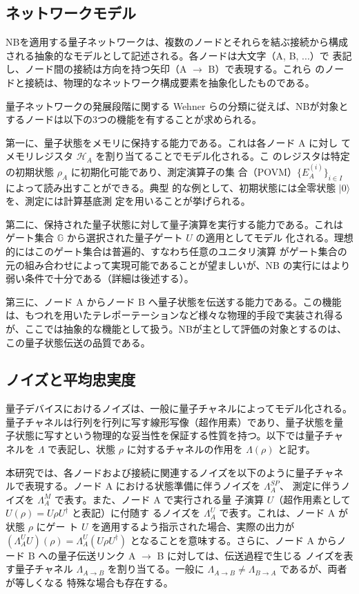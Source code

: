 \documentclass[12pt,a4paper,titlepage,dvipdfmx]{article}
\begin{document}
\subsection{ネットワークモデル}
\label{sec:ネットワークモデル}

NBを適用する量子ネットワークは、複数のノードとそれらを結ぶ接続から構成
される抽象的なモデルとして記述される。各ノードは大文字（A, B, ...）で
表記し、ノード間の接続は方向を持つ矢印（A $\to$ B）で表現する。これら
のノードと接続は、物理的なネットワーク構成要素を抽象化したものである。

量子ネットワークの発展段階に関する Wehner らの分類に従えば、NBが対象と
するノードは以下の3つの機能を有することが求められる。

第一に、量子状態をメモリに保持する能力である。これは各ノード A に対し
てメモリレジスタ $\mathcal{H}_A$ を割り当てることでモデル化される。こ
のレジスタは特定の初期状態 $\rho_A$ に初期化可能であり、測定演算子の集
合（POVM）$\{E_A^{(i)}\}_{i \in I}$ によって読み出すことができる。典型
的な例として、初期状態には全零状態 $|0\rangle$ を、測定には計算基底測
定を用いることが挙げられる。

第二に、保持された量子状態に対して量子演算を実行する能力である。これは
ゲート集合 $\mathbb{G}$ から選択された量子ゲート $U$ の適用としてモデル
化される。理想的にはこのゲート集合は普遍的、すなわち任意のユニタリ演算
がゲート集合の元の組み合わせによって実現可能であることが望ましいが、NB
の実行にはより弱い条件で十分である（詳細は後述する）。

第三に、ノード A からノード B へ量子状態を伝送する能力である。この機能
は、もつれを用いたテレポーテーションなど様々な物理的手段で実装され得る
が、ここでは抽象的な機能として扱う。NBが主として評価の対象とするのは、
この量子状態伝送の品質である。


\subsection{ノイズと平均忠実度}
\label{sec:ノイズと平均忠実度}
量子デバイスにおけるノイズは、一般に量子チャネルによってモデル化される。
量子チャネルは行列を行列に写す線形写像（超作用素）であり、量子状態を量
子状態に写すという物理的な妥当性を保証する性質を持つ。以下では量子チャ
ネルを $\Lambda$ で表記し、状態 $\rho$ に対するチャネルの作用を
$\Lambda(\rho)$ と記す。

本研究では、各ノードおよび接続に関連するノイズを以下のように量子チャネ
ルで表現する。ノード A における状態準備に伴うノイズを $\Lambda_A^{SP}$、
測定に伴うノイズを $\Lambda_A^M$ で表す。また、ノード A で実行される量
子演算 $U$（超作用素として $U(\rho) = U\rho U^\dagger$ と表記）に付随す
るノイズを $\Lambda_A^U$ で表す。これは、ノード A が状態 $\rho$ にゲー
ト $U$ を適用するよう指示された場合、実際の出力が $(\Lambda_A^U U)(\rho)
= \Lambda_A^U(U\rho U^\dagger)$ となることを意味する。さらに、ノード A
からノード B への量子伝送リンク A $\to$ B に対しては、伝送過程で生じる
ノイズを表す量子チャネル $\Lambda_{A \to B}$ を割り当てる。一般に
$\Lambda_{A \to B} \neq \Lambda_{B \to A}$ であるが、両者が等しくなる
特殊な場合も存在する。
\end{document}
